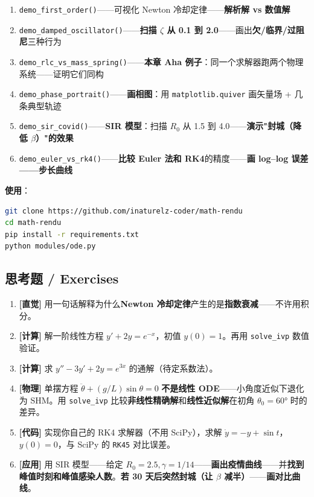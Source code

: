 \begin{enumerate}
\item \texttt{demo\_first\_order()}——可视化 Newton 冷却定律——\textbf{解析解 vs 数值解}
\item \texttt{demo\_damped\_oscillator()}——\textbf{扫描 $\zeta$ 从 0.1 到 2.0}——画出\textbf{欠/临界/过阻尼}三种行为
\item \texttt{demo\_rlc\_vs\_mass\_spring()}——\textbf{本章 Aha 例子}：同一个求解器跑两个物理系统——证明它们同构
\item \texttt{demo\_phase\_portrait()}——\textbf{画相图}：用 \texttt{matplotlib.quiver} 画矢量场 + 几条典型轨迹
\item \texttt{demo\_sir\_covid()}——\textbf{SIR 模型}：扫描 $R_0$ 从 1.5 到 4.0——\textbf{演示"封城（降低 $\beta$）"的效果}
\item \texttt{demo\_euler\_vs\_rk4()}——\textbf{比较 Euler 法和 RK4}的精度——\textbf{画 log--log 误差——步长曲线}
\end{enumerate}

\textbf{使用}：

\begin{lstlisting}[language=bash]
git clone https://github.com/inaturelz-coder/math-rendu
cd math-rendu
pip install -r requirements.txt
python modules/ode.py
\end{lstlisting}

\subsection{思考题 / Exercises}

\begin{enumerate}
\item \textbf{[直觉]} 用一句话解释为什么\textbf{Newton 冷却定律}产生的是\textbf{指数衰减}——不许用积分。
\item \textbf{[计算]} 解一阶线性方程 $y' + 2y = e^{-x}$，初值 $y(0)=1$。再用 \texttt{solve\_ivp} 数值验证。
\item \textbf{[计算]} 求 $y'' - 3y' + 2y = e^{3x}$ 的通解（待定系数法）。
\item \textbf{[物理]} 单摆方程 $\ddot{\theta} + (g/L)\sin\theta = 0$ \textbf{不是线性 ODE}——小角度近似下退化为 SHM。用 \texttt{solve\_ivp} 比较\textbf{非线性精确解}和\textbf{线性近似解}在初角 $\theta_0 = 60°$ 时的差异。
\item \textbf{[代码]} 实现你自己的 RK4 求解器（不用 SciPy），求解 $\dot y = -y + \sin t$，$y(0)=0$，与 SciPy 的 \texttt{RK45} 对比误差。
\item \textbf{[应用]} 用 SIR 模型——给定 $R_0 = 2.5, \gamma = 1/14$——\textbf{画出疫情曲线}——并\textbf{找到峰值时刻和峰值感染人数}。\textbf{若 30 天后突然封城（让 $\beta$ 减半）}——\textbf{画对比曲线}。
\end{enumerate}


